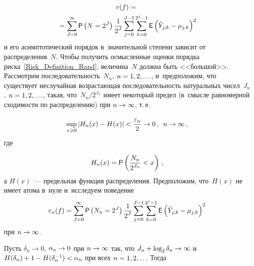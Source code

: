 \begin{multicols}{2}
\noindent
\begin{multline}
\label{Risk_Definition_Rand}
r(f)={}\\
{}=\sum\limits_{J=0}^{\infty}{\sf P}\left(N=2^J\right)
\displaystyle\frac{\displaystyle 1\mathstrut}{\displaystyle 2^J\mathstrut}\sum\limits_{j=0}^{J-1}\sum_{k=0}^{2^j-1}\limits 
{\sf E}\left(\hat{Y}_{j,k}-\mu_{j,k}\right)^2
\end{multline}
и его асимптотический порядок в~значительной степени 
зависит от распределения~$N$. Чтобы получить осмысленные оцен\-ки порядка 
рис\-ка~\eqref{Risk_Definition_Rand}, величина~$N$ долж\-на быть <<большой>>. 
Рас\-смот\-рим по\-сле\-до\-ва\-тель\-ность~$N_n$, $n\hm=1, 2,\ldots$,  и~предположим, 
что существует неслучайная возрастающая по\-сле\-до\-ва\-тель\-ность 
натуральных чисел~$J_n$, $n\hm=1, 2,\ldots$, такая, что~$N_n/2^{J_n}$ 
имеет некоторый предел (в~смыс\-ле равномерной схо\-ди\-мости по распределению) при 
$n\hm\to\infty$, т.\,е.

\noindent
\begin{equation}
\label{converge}
\sup\limits_{x\geqslant0}\left\vert H_n(x)-H(x)\right\vert<\displaystyle\frac{\displaystyle \varepsilon_n\mathstrut}{\displaystyle 2\mathstrut}\to0\,, \enskip  n\to\infty\,,
\end{equation}
где

\noindent
\begin{equation*}
H_n(x)={\sf P}\left(\displaystyle\frac{\displaystyle N_n\mathstrut}{\displaystyle 2^{J_n}\mathstrut}<x\right)\,,
\end{equation*}
а $H(x)$~--- предельная функция распределения. Предположим, что~$H(x)$ 
не имеет атома в~нуле и~исследуем поведение
\begin{equation*}
r_n(f)=\sum\limits_{J=0}^{\infty}{\sf P}\left(N_n=2^J\right)\displaystyle\frac{\displaystyle 1\mathstrut}{\displaystyle 2^J\mathstrut}
\sum\limits_{j=0}^{J-1}\sum_{k=0}^{2^j-1}\limits 
{\sf E}\left(\hat{Y}_{j,k}-\mu_{j,k}\right)^2 
\end{equation*}
при $n\hm\to\infty$.

\pagebreak

Пусть $\delta_n\to0$, $\alpha_n\hm\to0$ при $n\hm\to\infty$ так, 
что $J_n\hm+\log_2\delta_n\hm\to\infty$ и~$H(\delta_n)\hm+1\hm-H(\delta^{-1}_n)
\hm<\alpha_n$ при всех $n\hm=1, 2,\ldots$
Тогда


\end{multicols}
